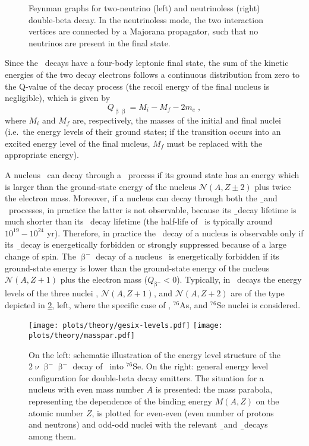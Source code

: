 \begin{figure}
  \centering%
  \caption{%
    Feynman graphs for two-neutrino (left) and neutrinoless (right) double-beta decay. In
    the neutrinoless mode, the two interaction vertices are connected by a Majorana
    propagator, such that no neutrinos are present in the final state.
  }\label{fig:nbb:feydiag}
\end{figure}

Since the \nnbb\ decays have a four-body leptonic final state, the sum of the kinetic
energies of the two decay electrons follows a continuous distribution from zero to the
Q-value of the decay process (the recoil energy of the final nucleus is negligible), which
is given by
\[
  Q_{\upbeta\upbeta} = M_i - M_f - 2m_e \;,
\]
where $M_i$ and $M_f$ are, respectively, the masses of the initial and final nuclei
(i.e.~the energy levels of their ground states; if the transition occurs into an excited
energy level of the final nucleus, $M_f$ must be replaced with the appropriate energy).

A nucleus \NAZ\ can decay through a \nnbb\ process if its ground state has an energy which
is larger than the ground-state energy of the nucleus $\mathcal{N}(A,Z\pm2)$ plus twice
the electron mass. Moreover, if a nucleus can decay through both the \b\ and \nnbb\
processes, in practice the latter is not observable, because its \b\ decay lifetime is
much shorter than its \nnbb\ decay lifetime (the half-life of \nnbb\ is typically around
$10^{19}-10^{24}$ yr). Therefore, in practice the \nnbb\ decay of a nucleus is observable
only if its \b\ decay is energetically forbidden or strongly suppressed because of a large
change of spin. The $\upbeta^-$ decay of a nucleus \NAZ\ is energetically forbidden if its
ground-state energy is lower than the ground-state energy of the nucleus
$\mathcal{N}(A,Z+1)$ plus the electron mass ($Q_{\upbeta^{-}} < 0$).  Typically, in
\nnbbm\ decays the energy levels of the three nuclei \NAZ, $\mathcal{N}(A,Z+1)$, and
$\mathcal{N}(A,Z+2)$ are of the type depicted in \cref{fig:nbb:gesixlevels}, left, where
the specific case of \gesix, $^{76}$As, and $^{76}$Se nuclei is considered.

\begin{figure}
  \centering
  \texttt{[image: plots/theory/gesix-levels.pdf]}%
  \texttt{[image: plots/theory/masspar.pdf]}%
  \caption{%
    On the left: schematic illustration of the energy level structure of the
    $2\upnu\upbeta^-\upbeta^-$ decay of \gesix\ into $^{76}$Se. On the right: general
    energy level configuration for double-beta decay emitters.  The situation for a
    nucleus with even mass number $A$ is presented: the mass parabola, representing the
    dependence of the binding energy $M(A,Z)$ on the atomic number $Z$, is plotted for
    even-even (even number of protons and neutrons) and odd-odd nuclei with the relevant
    \b\ and \b\b\ decays among them.
  }\label{fig:nbb:gesixlevels}
\end{figure}

